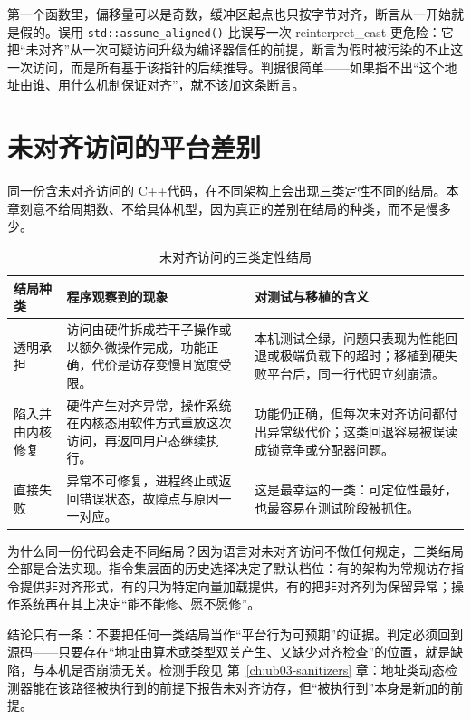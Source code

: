 \documentclass[12pt,a4paper,fontset=fandol]{ctexbook}
\newcommand{\Fn}[1]{\texttt{#1()}}
\newcommand{\Lang}[1]{\textsf{#1}}
\newcommand{\CPP}{\Lang{C++}}
\begin{document}
第一个函数里，偏移量可以是奇数，缓冲区起点也只按字节对齐，断言从一开始就是假的。误用 \Fn{std::assume\_aligned} 比误写一次 \Lang{reinterpret\_cast} 更危险：它把“未对齐”从一次可疑访问升级为编译器信任的前提，断言为假时被污染的不止这一次访问，而是所有基于该指针的后续推导。判据很简单——如果指不出“这个地址由谁、用什么机制保证对齐”，就不该加这条断言。

\section{未对齐访问的平台差别}\label{sec:ub07-platform}

同一份含未对齐访问的 \CPP 代码，在不同架构上会出现三类定性不同的结局。本章刻意不给周期数、不给具体机型，因为真正的差别在结局的种类，而不是慢多少。

\begin{table}[htbp]
\centering
\begin{tabular}{>{\raggedright\arraybackslash}p{}>{\raggedright\arraybackslash}p{}>{\raggedright\arraybackslash}p{}}
\toprule
结局种类 & 程序观察到的现象 & 对测试与移植的含义 \\
\midrule
透明承担 &
  访问由硬件拆成若干子操作或以额外微操作完成，功能正确，代价是访存变慢且宽度受限。 &
  本机测试全绿，问题只表现为性能回退或极端负载下的超时；移植到硬失败平台后，同一行代码立刻崩溃。 \\
陷入并由内核修复 &
  硬件产生对齐异常，操作系统在内核态用软件方式重放这次访问，再返回用户态继续执行。 &
  功能仍正确，但每次未对齐访问都付出异常级代价；这类回退容易被误读成锁竞争或分配器问题。 \\
直接失败 &
  异常不可修复，进程终止或返回错误状态，故障点与原因一一对应。 &
  这是最幸运的一类：可定位性最好，也最容易在测试阶段被抓住。 \\
\bottomrule
\end{tabular}
\caption{未对齐访问的三类定性结局}
\label{tab:ub07-platform-outcomes}
\end{table}

为什么同一份代码会走不同结局？因为语言对未对齐访问不做任何规定，三类结局全部是合法实现。指令集层面的历史选择决定了默认档位：有的架构为常规访存指令提供非对齐形式，有的只为特定向量加载提供，有的把非对齐列为保留异常；操作系统再在其上决定“能不能修、愿不愿修”。

结论只有一条：不要把任何一类结局当作“平台行为可预期”的证据。判定必须回到源码——只要存在“地址由算术或类型双关产生、又缺少对齐检查”的位置，就是缺陷，与本机是否崩溃无关。检测手段见 第~\ref{ch:ub03-sanitizers} 章：地址类动态检测器能在该路径被执行到的前提下报告未对齐访存，但“被执行到”本身是新加的前提。
\end{document}

